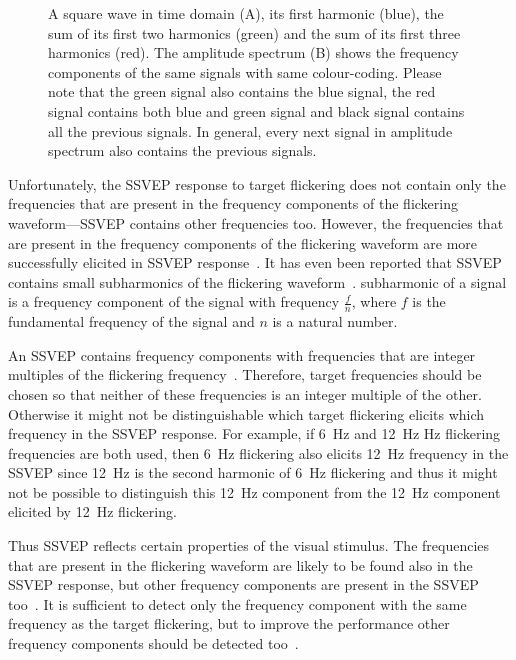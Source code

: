 \begin{figure}[h]
	
	\caption{A square wave in time domain (A), its first harmonic (blue), the sum of its first two harmonics (green) and the sum of its first three harmonics (red). The amplitude spectrum (B) shows the frequency components of the same signals with same colour-coding. Please note that the green signal also contains the blue signal, the red signal contains both blue and green signal and black signal contains all the previous signals. In general, every next signal in amplitude spectrum also contains the previous signals.}
	\label{fig:square_wave}
\end{figure}

Unfortunately, the \gls{SSVEP} response to \gls{target} \gls{flickering} does not contain only the frequencies that are present in the \glspl{frequency component} of the \gls{flickering waveform}---\gls{SSVEP} contains other frequencies too. However, the frequencies that are present in the \glspl{frequency component} of the \gls{flickering waveform} are more successfully elicited in \gls{SSVEP} response~\cite{square_sine}. It has even been reported that \gls{SSVEP} contains small \glspl{subharmonic} of the \gls{flickering waveform}~\cite{ssvep_response}. \Gls{subharmonic} of a signal is a \gls{frequency component} of the signal with frequency $\frac{f}{n}$, where $f$ is the \gls{fundamental} frequency of the signal and $n$ is a natural number.

An \gls{SSVEP} contains \glspl{frequency component} with frequencies that are integer multiples of the \gls{flickering} frequency~\cite{ssvep_response}. Therefore, \gls{target} frequencies should be chosen so that neither of these frequencies is an integer multiple of the other. Otherwise it might not be distinguishable which \gls{target} \gls{flickering} elicits which frequency in the \gls{SSVEP} response. For example, if \SI{6}{Hz} and \SI{12}{Hz} Hz \gls{flickering} frequencies are both used, then \SI{6}{Hz} \gls{flickering} also elicits \SI{12}{Hz} frequency in the \gls{SSVEP} since \SI{12}{Hz} is the second harmonic of \SI{6}{Hz} \gls{flickering} and thus it might not be possible to distinguish this \SI{12}{Hz} component from the \SI{12}{Hz} component elicited by \SI{12}{Hz} \gls{flickering}.

Thus \gls{SSVEP} reflects certain properties of the visual stimulus. The frequencies that are present in the \gls{flickering waveform} are likely to be found also in the \gls{SSVEP} response, but other \glspl{frequency component} are present in the \gls{SSVEP} too~\cite{square_sine}. It is sufficient to detect only the \gls{frequency component} with the same frequency as the \gls{target} \gls{flickering}, but to improve the performance other \glspl{frequency component} should be detected too~\cite{harmonic_imrpovement}.


